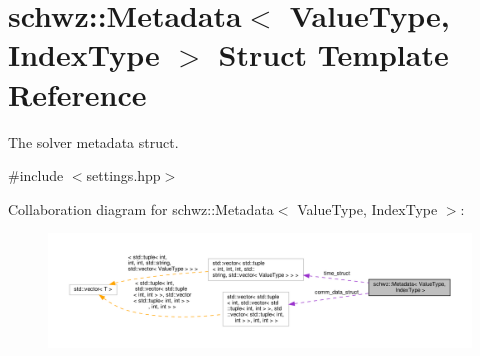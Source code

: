 \hypertarget{structschwz_1_1Metadata}{}\section{schwz\+:\+:Metadata$<$ Value\+Type, Index\+Type $>$ Struct Template Reference}
\label{structschwz_1_1Metadata}


The solver metadata struct.  




{\ttfamily \#include $<$settings.\+hpp$>$}



Collaboration diagram for schwz\+:\+:Metadata$<$ Value\+Type, Index\+Type $>$\+:
\nopagebreak
\begin{figure}[H]
\begin{center}
\leavevmode
\includegraphics[width=350pt]{structschwz_1_1Metadata__coll__graph}
\end{center}
\end{figure}
